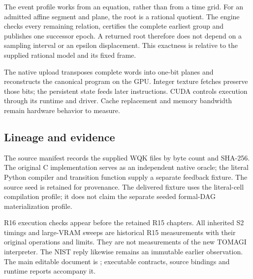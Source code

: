 The event profile works from an equation, rather than from a time grid.
For an admitted affine segment and plane, the root is a rational quotient.
The engine checks every remaining relation, certifies the complete earliest
group and publishes one successor epoch. A returned root therefore does not
depend on a sampling interval or an epsilon displacement. This exactness is
relative to the supplied rational model and its fixed frame.

The native upload transposes complete words into one-bit planes and
reconstructs the canonical program on the GPU. Integer texture fetches
preserve those bits; the persistent state feeds later instructions. CUDA
controls execution through its runtime and driver. Cache replacement and
memory bandwidth remain hardware behavior to measure.

\subsection*{Lineage and evidence}
The source manifest records the supplied WQK files by byte count and SHA-256.
The original C implementation serves as an independent native oracle; the
literal Python compiler and transition function supply a separate feedback
fixture. The source seed is retained for provenance. The delivered fixture
uses the literal-cell compilation profile; it does not claim the separate
seeded formal-DAG materialization profile.

R16 execution checks appear before the retained R15 chapters. All inherited
S2 timings and large-VRAM sweeps are historical R15 measurements with their
original operations and limits. They are not measurements of the new TOMAGI
interpreter. The NIST reply likewise remains an immutable earlier observation.
The main editable document is ; executable contracts,
source bindings and runtime reports accompany it.
\clearpage
